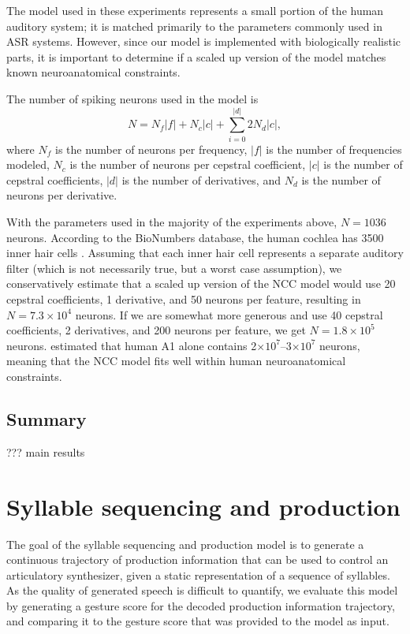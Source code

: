 The model used in these experiments
represents a small portion
of the human auditory system;
it is matched primarily to the parameters
commonly used in ASR systems.
However, since our model is
implemented with biologically realistic parts,
it is important to determine
if a scaled up version of the model
matches known neuroanatomical constraints.

The number of spiking neurons used
in the model is
\begin{equation}
  N = N_f |f| + N_c |c| + \sum_{i=0}^{|d|} 2 N_d |c|,
\end{equation}
where $N_f$ is the number of neurons per frequency,
$|f|$ is the number of frequencies modeled,
$N_c$ is the number of neurons per cepstral coefficient,
$|c|$ is the number of cepstral coefficients,
$|d|$ is the number of derivatives,
and $N_d$ is the number of neurons per derivative.

With the parameters used
in the majority of the experiments above,
$N=1036$ neurons.
According to the BioNumbers database,
the human cochlea has 3500 inner hair cells
\citep[BNID~100697]{milo2010}.
Assuming that each inner hair cell
represents a separate auditory filter
(which is not necessarily true,
but a worst case assumption),
we conservatively estimate
that a scaled up version
of the NCC model
would use 20 cepstral coefficients,
1 derivative, and 50 neurons per feature,
resulting in $N=7.3 \times 10^4$ neurons.
If we are somewhat more generous
and use 40 cepstral coefficients,
2 derivatives, and 200 neurons per feature,
we get $N=1.8 \times 10^5$ neurons.
\citet{smiley2013} estimated
that human A1 alone contains
2$\times 10^7$--3$\times 10^7$ neurons,
meaning that the NCC model
fits well within human neuroanatomical constraints.

\subsection{Summary}

??? main results

\section{Syllable sequencing and production}
\label{sec:results-production}

The goal of the syllable sequencing and production model
is to generate a continuous trajectory
of production information
that can be used to control
an articulatory synthesizer,
given a static representation
of a sequence of syllables.
As the quality of generated speech
is difficult to quantify,
we evaluate this model
by generating a gesture score
for the decoded production information trajectory,
and comparing it
to the gesture score that was provided
to the model as input.

